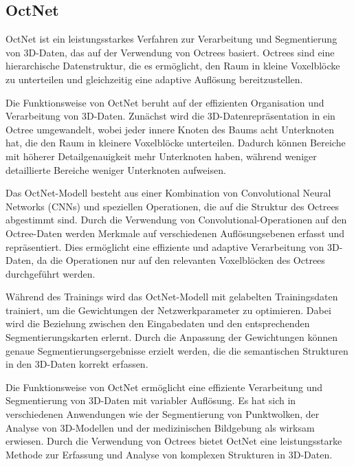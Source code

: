 \subsection{OctNet}

OctNet ist ein leistungsstarkes Verfahren zur Verarbeitung und Segmentierung
von 3D-Daten, das auf der Verwendung von Octrees basiert. Octrees sind eine
hierarchische Datenstruktur, die es ermöglicht, den Raum in kleine Voxelblöcke
zu unterteilen und gleichzeitig eine adaptive Auflösung bereitzustellen.

Die Funktionsweise von OctNet beruht auf der effizienten Organisation und
Verarbeitung von 3D-Daten. Zunächst wird die 3D-Datenrepräsentation in ein
Octree umgewandelt, wobei jeder innere Knoten des Baums acht Unterknoten hat,
die den Raum in kleinere Voxelblöcke unterteilen. Dadurch können Bereiche mit
höherer Detailgenauigkeit mehr Unterknoten haben, während weniger detaillierte
Bereiche weniger Unterknoten aufweisen.

Das OctNet-Modell besteht aus einer Kombination von Convolutional Neural
Networks (CNNs) und speziellen Operationen, die auf die Struktur des Octrees
abgestimmt sind. Durch die Verwendung von Convolutional-Operationen auf den
Octree-Daten werden Merkmale auf verschiedenen Auflösungsebenen erfasst und
repräsentiert. Dies ermöglicht eine effiziente und adaptive Verarbeitung von
3D-Daten, da die Operationen nur auf den relevanten Voxelblöcken des Octrees
durchgeführt werden.

Während des Trainings wird das OctNet-Modell mit gelabelten Trainingsdaten
trainiert, um die Gewichtungen der Netzwerkparameter zu optimieren. Dabei wird
die Beziehung zwischen den Eingabedaten und den entsprechenden
Segmentierungskarten erlernt. Durch die Anpassung der Gewichtungen können
genaue Segmentierungsergebnisse erzielt werden, die die semantischen Strukturen
in den 3D-Daten korrekt erfassen.

Die Funktionsweise von OctNet ermöglicht eine effiziente Verarbeitung und
Segmentierung von 3D-Daten mit variabler Auflösung. Es hat sich in
verschiedenen Anwendungen wie der Segmentierung von Punktwolken, der Analyse
von 3D-Modellen und der medizinischen Bildgebung als wirksam erwiesen. Durch
die Verwendung von Octrees bietet OctNet eine leistungsstarke Methode zur
Erfassung und Analyse von komplexen Strukturen in 3D-Daten.